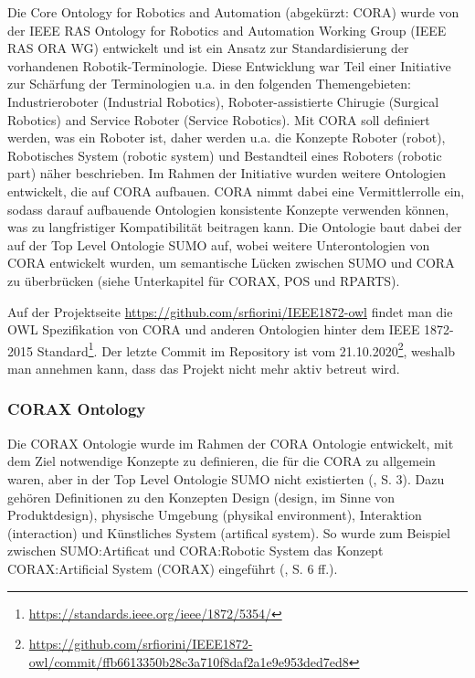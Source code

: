 \documentclass{article}
\begin{document}

Die Core Ontology for Robotics and Automation (abgekürzt: CORA) \cite{prestes2014core} wurde von der IEEE RAS Ontology for Robotics and Automation Working Group (IEEE RAS ORA WG) entwickelt und ist ein Ansatz zur Standardisierung der vorhandenen Robotik-Terminologie.
Diese Entwicklung war Teil einer Initiative zur Schärfung der Terminologien u.a. in den folgenden Themengebieten: Industrieroboter (Industrial Robotics), Roboter-assistierte Chirugie (Surgical Robotics) and Service Roboter (Service Robotics).
Mit CORA soll definiert werden, was ein Roboter ist, daher werden u.a. die Konzepte Roboter (robot), Robotisches System (robotic system) und Bestandteil eines Roboters (robotic part) näher beschrieben.
Im Rahmen der Initiative wurden weitere Ontologien entwickelt, die auf CORA aufbauen.
CORA nimmt dabei eine Vermittlerrolle ein, sodass darauf aufbauende Ontologien konsistente Konzepte verwenden können, was zu langfristiger Kompatibilität beitragen kann.
Die Ontologie baut dabei der auf der Top Level Ontologie SUMO auf, wobei weitere Unterontologien von CORA entwickelt wurden, um semantische Lücken zwischen SUMO und CORA zu überbrücken (siehe Unterkapitel für CORAX, POS und RPARTS).

Auf der Projektseite \url{https://github.com/srfiorini/IEEE1872-owl} findet man die OWL Spezifikation von CORA und anderen Ontologien hinter dem IEEE 1872-2015 Standard\footnote{\url{https://standards.ieee.org/ieee/1872/5354/}}. Der letzte Commit im Repository ist vom 21.10.2020\footnote{\url{https://github.com/srfiorini/IEEE1872-owl/commit/ffb6613350b28c3a710f8daf2a1e9e953ded7ed8}}, weshalb man annehmen kann, dass das Projekt nicht mehr aktiv betreut wird.

\subsubsection{CORAX Ontology}


Die CORAX Ontologie wurde im Rahmen der CORA Ontologie entwickelt, mit dem Ziel notwendige Konzepte zu definieren, die für die CORA zu allgemein waren, aber in der Top Level Ontologie SUMO nicht existierten (\cite{fiorini2015extensions}, S. 3).
Dazu gehören Definitionen zu den Konzepten Design (design, im Sinne von Produktdesign), physische Umgebung (physikal environment), Interaktion (interaction) und Künstliches System (artifical system).
So wurde zum Beispiel zwischen SUMO:Artificat und CORA:Robotic System das Konzept CORAX:Artificial System (CORAX) eingeführt (\cite{fiorini2015extensions}, S. 6 ff.).
\end{document}
